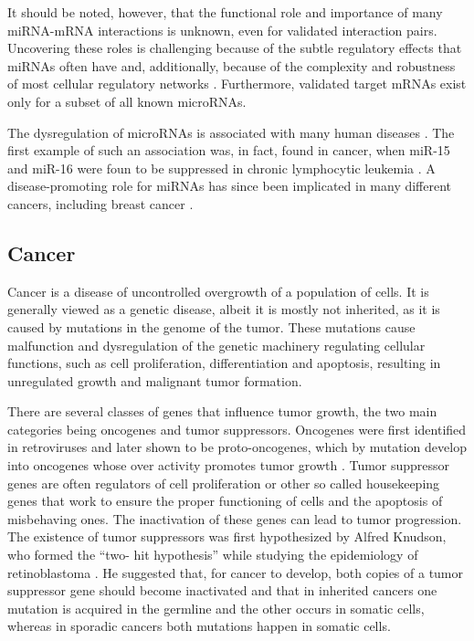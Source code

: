 

It should be noted, however, that the functional role and importance of many miRNA-mRNA
interactions is unknown, even for validated interaction pairs. Uncovering
these roles is challenging because of the subtle regulatory effects that
miRNAs often have and, additionally, because of the complexity and robustness
of most cellular regulatory networks \citep{Bartel2009}. Furthermore,
validated target mRNAs exist only for a subset of all known microRNAs.

The dysregulation of microRNAs is associated with many human diseases
\citep{Jiang2009,VAIHDATÄMÄREFE}. The first example of such an association was, in
fact, found in cancer, when miR-15 and miR-16 were foun to be suppressed in
chronic lymphocytic leukemia \citep{Musilova2015}. A disease-promoting role
for miRNAs has since been implicated in many different cancers, including
breast cancer \citep{Melo2011}.









\subsection{Cancer}\label{cancer}

Cancer is a disease of uncontrolled overgrowth of a population of cells. It is
generally viewed as a genetic disease, albeit it is mostly not inherited, as it is
caused by  mutations in the genome of the tumor. These mutations cause malfunction
and dysregulation of the genetic machinery regulating cellular functions, such
as cell proliferation, differentiation and apoptosis, resulting in
unregulated growth and malignant tumor formation.

There are several classes of genes that influence tumor growth, the two main
categories being oncogenes and tumor suppressors. Oncogenes were first
identified in retroviruses and later shown to be proto-oncogenes, which by
mutation develop into oncogenes whose over activity promotes tumor growth
\citep{Varmus1988}. Tumor suppressor genes are often regulators of cell
proliferation or other so called housekeeping genes that work to ensure the
proper functioning of cells and the apoptosis of misbehaving ones. The
inactivation of these genes can lead to tumor progression. The existence of
tumor suppressors was first hypothesized by Alfred Knudson, who formed the “two-
hit hypothesis” while studying the epidemiology of retinoblastoma
\citep{Knudson1971}. He suggested that, for cancer to develop, both copies of
a tumor suppressor gene should become inactivated and that in inherited
cancers one mutation is acquired in the germline and the other occurs in
somatic cells, whereas in sporadic cancers both mutations happen in somatic
cells.

